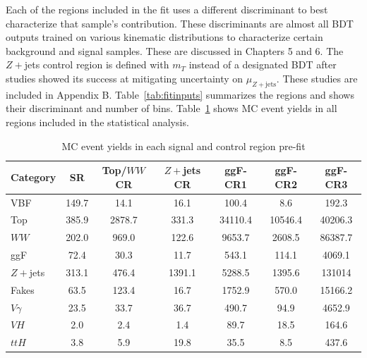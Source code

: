 Each of the regions included in the fit uses a different discriminant to best characterize that sample's contribution. These discriminants are almost all BDT outputs trained on various kinematic distributions to characterize certain background and signal samples. These are discussed in Chapters 5 and 6. The $Z+$jets control region is defined with $m_T$ instead of a designated BDT after studies showed its success at mitigating uncertainty on $\mu_{Z+\text{jets}}$. These studies are included in Appendix B. Table~\ref{tab:fitinputs} summarizes the regions and shows their discriminant and number of bins. Table~\ref{tab:cryields} shows MC event yields in all regions included in the statistical analysis. 
\begin{table}[!h]
  \begin{center}
    \caption{Fit categories, including SR and CRs, distributions and number of bins used in the fit.}
    \label{tab:fitinputs}
  \end{center}
\end{table}

\begin{table}[!h]
  \begin{center}
    \begin{tabular}{l|cccccc}
      Category         & SR    & Top/$WW$ CR   & $Z+$jets CR           & ggF-CR1               & ggF-CR2       & ggF-CR3 \\
      \hline
      \hline
      VBF      & 149.7 & 14.1 & 16.1 & 100.4 & 8.6 & 192.3 \\
      Top    &  385.9 & 2878.7 & 331.3 & 34110.4 & 10546.4 & 40206.3 \\
      $WW$ & 202.0 & 969.0 & 122.6 & 9653.7 & 2608.5 & 86387.7 \\
      ggF & 72.4 & 30.3 & 11.7 & 543.1 & 114.1 & 4069.1 \\
      $Z+$jets & 313.1 & 476.4 & 1391.1 & 5288.5 & 1395.6 & 131014 \\
      Fakes & 63.5 & 123.4 & 16.7 & 1752.9 & 570.0 & 15166.2 \\
      $V\gamma$ & 23.5 & 33.7 & 36.7 & 490.7 & 94.9 & 4652.9 \\
      $VH$ & 2.0 & 2.4 & 1.4 & 89.7 & 18.5 & 164.6 \\
      $ttH$ &  3.8 &  5.9 &  19.8 & 35.5 & 8.5 & 437.6 \\
      \hline
    \end{tabular}
    \caption{MC event yields in each signal and control region pre-fit}
    \label{tab:cryields}
  \end{center}
\end{table}

